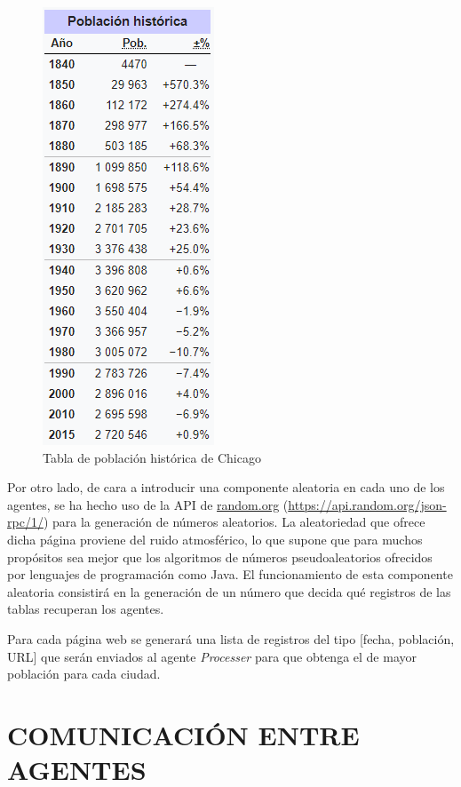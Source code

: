 \documentclass{estilo}
\begin{document}
    \begin{figure}[ht]
        \centering
        \includegraphics[scale=0.9]{table_Chicago.PNG} 
        \caption{Tabla de población histórica de Chicago}
        \label{fig:fig2}
    \end{figure}

    Por otro lado, de cara a introducir una componente aleatoria en cada uno de los agentes, se ha hecho uso de la API de \url{random.org} (\url{https://api.random.org/json-rpc/1/}) para la generación de números aleatorios. La aleatoriedad que ofrece dicha página proviene del ruido atmosférico, lo que supone que para muchos propósitos sea mejor que los algoritmos de números pseudoaleatorios ofrecidos por lenguajes de programación como Java. El funcionamiento de esta componente aleatoria consistirá en la generación de un número que decida qué registros de las tablas recuperan los agentes. 
    
    Para cada página web se generará una lista de registros del tipo [fecha, población, URL] que serán enviados al agente \textit{Processer} para que obtenga el de mayor población para cada ciudad.
    
    \bigskip
    \section{COMUNICACIÓN ENTRE AGENTES}
    
\end{document}

